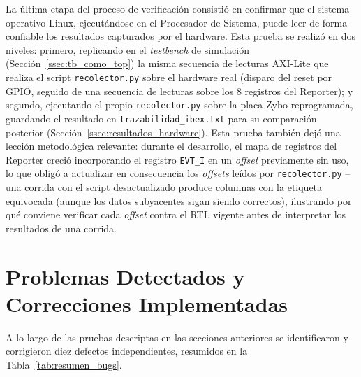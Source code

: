 La última etapa del proceso de verificación consistió en confirmar que el
sistema operativo Linux, ejecutándose en el Procesador de Sistema, puede
leer de forma confiable los resultados capturados por el hardware. Esta
prueba se realizó en dos niveles: primero, replicando en el
\textit{testbench} de simulación (Sección~\ref{ssec:tb_como_top}) la misma
secuencia de lecturas AXI-Lite que realiza el script
\texttt{recolector.py} sobre el hardware real (disparo del reset por GPIO,
seguido de una secuencia de lecturas sobre los $8$ registros del
Reporter); y segundo, ejecutando el propio \texttt{recolector.py} sobre la
placa Zybo reprogramada, guardando el resultado en
\texttt{trazabilidad\_ibex.txt} para su comparación posterior
(Sección~\ref{ssec:resultados_hardware}). Esta prueba también dejó una
lección metodológica relevante: durante el desarrollo, el mapa de
registros del Reporter creció incorporando el registro \texttt{EVT\_I} en
un \textit{offset} previamente sin uso, lo que obligó a actualizar en
consecuencia los \textit{offsets} leídos por \texttt{recolector.py} -- una
corrida con el script desactualizado produce columnas con la etiqueta
equivocada (aunque los datos subyacentes sigan siendo correctos),
ilustrando por qué conviene verificar cada \textit{offset} contra el RTL
vigente antes de interpretar los resultados de una corrida.


\section{Problemas Detectados y Correcciones Implementadas}
\label{sec:problemas_correcciones}

A lo largo de las pruebas descriptas en las secciones anteriores se
identificaron y corrigieron diez defectos independientes, resumidos en la
Tabla~\ref{tab:resumen_bugs}.


